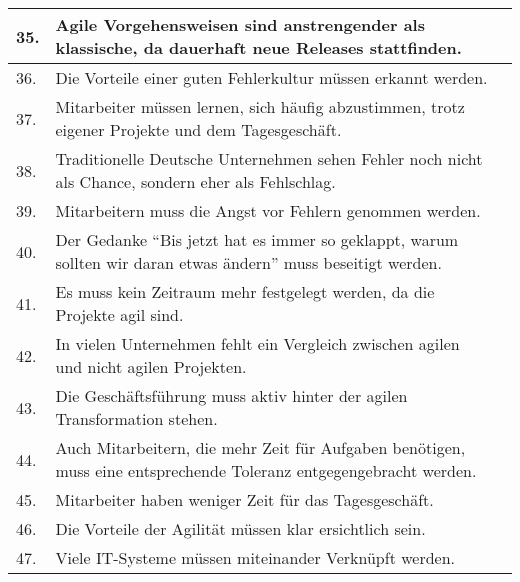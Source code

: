 \begin{longtable}{|p{}|p{5cm}|p{}|}
	35. & Agile Vorgehensweisen sind anstrengender als klassische, da dauerhaft neue Releases stattfinden.
	&
	\\ \hline
	36. & Die Vorteile einer guten Fehlerkultur müssen erkannt werden.
	&
	\\ \hline
	37. & Mitarbeiter müssen lernen, sich häufig abzustimmen, trotz eigener Projekte und dem Tagesgeschäft.
	&
	\\ \hline
	38. & Traditionelle Deutsche Unternehmen sehen Fehler noch nicht als Chance, sondern eher als Fehlschlag.
	&
	\\ \hline
	39. & Mitarbeitern muss die Angst vor Fehlern genommen werden.
	&
	\\ \hline
	40. & Der Gedanke \enquote{Bis jetzt hat es immer so geklappt, warum sollten wir daran etwas ändern} muss beseitigt werden.
	&
	\\ \hline
	41. & Es muss kein Zeitraum mehr festgelegt werden, da die Projekte agil sind.
	&
	\\ \hline
	42. & In vielen Unternehmen fehlt ein Vergleich zwischen agilen und nicht agilen Projekten.
	&
	\\ \hline
	43. & Die Geschäftsführung muss aktiv hinter der agilen Transformation stehen.
	&
	\\ \hline
	44. & Auch Mitarbeitern, die mehr Zeit für Aufgaben benötigen, muss eine entsprechende Toleranz entgegengebracht werden.
	&
	\\ \hline
	45. & Mitarbeiter haben weniger Zeit für das Tagesgeschäft.
	&
	\\ \hline
	46. & Die Vorteile der Agilität müssen klar ersichtlich sein.
	&
	\\ \hline
	47. & Viele IT-Systeme müssen miteinander Verknüpft werden.
	&
	\\ 
	
\end{longtable}